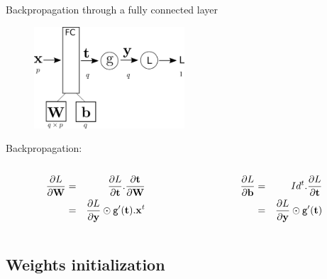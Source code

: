 \documentclass[xcolor=pdftex,dvipsnames,table,mathserif]{beamer}
\begin{document}
\begin{frame}{Backpropagation through a fully connected layer}
  \begin{figure}
    \includegraphics[width=0.5\textwidth]{bp_fc.png}
  \end{figure}

  Backpropagation:
  \begin{columns}
    \begin{column}{.5\textwidth}
      \begin{eqnarray*}
        \pdv{L}{\mathbf{W}} &=& \pdv{L}{\mathbf{t}}.\pdv{\mathbf{t}}{\mathbf{W}} \\
        &=& \pdv{L}{\mathbf{y}} \odot \texttt{g}'(\mathbf{t}).\mathbf{x}^t
      \end{eqnarray*}
    \end{column}

    \begin{column}{.5\textwidth}
      \begin{eqnarray*}
        \pdv{L}{\mathbf{b}}  &=& Id^t . \pdv{L}{\mathbf{t}}\\
        &=&  \pdv{L}{\mathbf{y}} \odot \texttt{g}'(\mathbf{t})
      \end{eqnarray*}
    \end{column}
  \end{columns}


\end{frame}


\subsection{Weights initialization}
\end{document}

